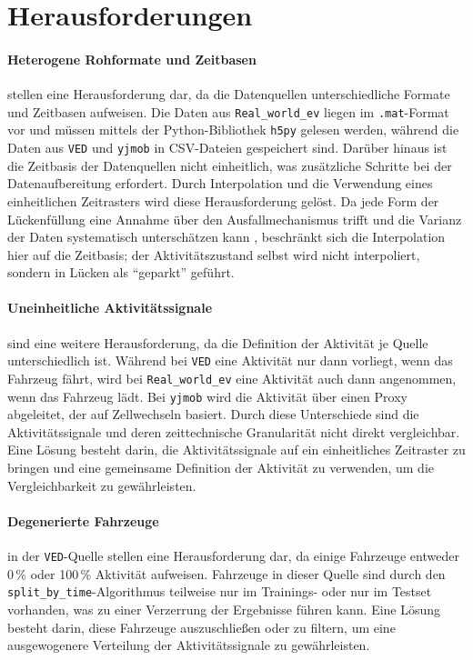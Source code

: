 \section{Herausforderungen}
\label{sec:herausforderungen}

\paragraph{Heterogene Rohformate und Zeitbasen} stellen eine Herausforderung dar, da die Datenquellen unterschiedliche Formate und Zeitbasen aufweisen. Die Daten aus \texttt{Real\_world\_ev} liegen im \texttt{.mat}-Format vor und müssen mittels der Python-Bibliothek \texttt{h5py} gelesen werden, während die Daten aus \texttt{VED} und \texttt{yjmob} in CSV-Dateien gespeichert sind. Darüber hinaus ist die Zeitbasis der Datenquellen nicht einheitlich, was zusätzliche Schritte bei der Datenaufbereitung erfordert. Durch Interpolation und die Verwendung eines einheitlichen Zeitrasters wird diese Herausforderung gelöst. Da jede Form der Lückenfüllung eine Annahme über den Ausfallmechanismus trifft und die Varianz der Daten systematisch unterschätzen kann \parencite[Kap. 1.3]{vanbuuren2018fimd}, beschränkt sich die Interpolation hier auf die Zeitbasis; der Aktivitätszustand selbst wird nicht interpoliert, sondern in Lücken als \enquote{geparkt} geführt.

\paragraph{Uneinheitliche Aktivitätssignale} sind eine weitere Herausforderung, da die Definition der Aktivität je Quelle unterschiedlich ist. Während bei \texttt{VED} eine Aktivität nur dann vorliegt, wenn das Fahrzeug fährt, wird bei \texttt{Real\_world\_ev} eine Aktivität auch dann angenommen, wenn das Fahrzeug lädt. Bei \texttt{yjmob} wird die Aktivität über einen Proxy abgeleitet, der auf Zellwechseln basiert. Durch diese Unterschiede sind die Aktivitätssignale und deren zeittechnische Granularität nicht direkt vergleichbar. Eine Lösung besteht darin, die Aktivitätssignale auf ein einheitliches Zeitraster zu bringen und eine gemeinsame Definition der Aktivität zu verwenden, um die Vergleichbarkeit zu gewährleisten.

\paragraph{Degenerierte Fahrzeuge} in der \texttt{VED}-Quelle stellen eine Herausforderung dar, da einige Fahrzeuge entweder 0\,\% oder 100\,\% Aktivität aufweisen. Fahrzeuge in dieser Quelle sind durch den \texttt{split\_by\_time}-Algorithmus teilweise nur im Trainings- oder nur im Testset vorhanden, was zu einer Verzerrung der Ergebnisse führen kann. Eine Lösung besteht darin, diese Fahrzeuge auszuschließen oder zu filtern, um eine ausgewogenere Verteilung der Aktivitätssignale zu gewährleisten.


